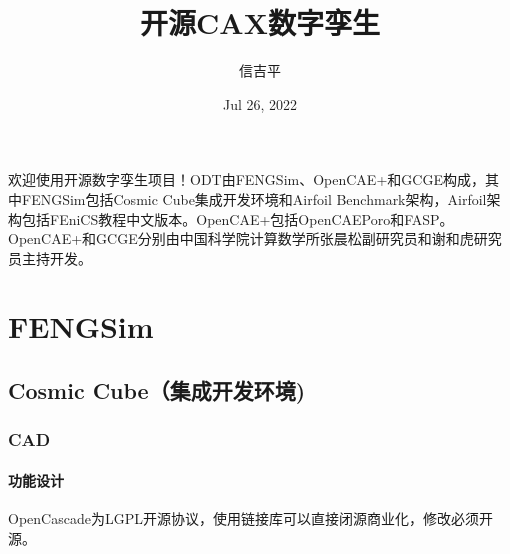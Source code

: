 \documentclass[letterpaper,10pt,english]{sphinxmanual}
\title{开源CAX数字孪生}
\date{Jul 26, 2022}
\author{信吉平}
\let\sphinxpxdimen\pdfpxdimen\else\newdimen\sphinxpxdimen
\begin{document}
\pagestyle{empty}
\sphinxmaketitle
\pagestyle{plain}
\sphinxtableofcontents
\pagestyle{normal}
\label{\detokenize{index::doc}}
\sphinxstepscope



\sphinxAtStartPar
欢迎使用开源数字孪生项目！ODT由FENGSim、OpenCAE+和GCGE构成，其中FENGSim包括Cosmic Cube集成开发环境和Airfoil Benchmark架构，Airfoil架构包括FEniCS教程中文版本。OpenCAE+包括OpenCAEPoro和FASP。OpenCAE+和GCGE分别由中国科学院计算数学所张晨松副研究员和谢和虎研究员主持开发。

\sphinxstepscope


\chapter{FENGSim}
\label{\detokenize{src/fengsim/main:fengsim}}\label{\detokenize{src/fengsim/main::doc}}
\sphinxstepscope


\section{Cosmic Cube（集成开发环境)}
\label{\detokenize{src/fengsim/cosmiccube:cosmic-cube}}\label{\detokenize{src/fengsim/cosmiccube::doc}}
\sphinxstepscope


\subsection{CAD}
\label{\detokenize{src/fengsim/cad:cad}}\label{\detokenize{src/fengsim/cad::doc}}
\sphinxstepscope


\subsubsection{功能设计}
\label{\detokenize{src/fengsim/cad_design:id1}}\label{\detokenize{src/fengsim/cad_design::doc}}
\sphinxAtStartPar
OpenCascade为LGPL开源协议，使用链接库可以直接闭源商业化，修改必须开源。

\noindent\sphinxincludegraphics[width=600\sphinxpxdimen]{{cad}.png}
\end{document}
